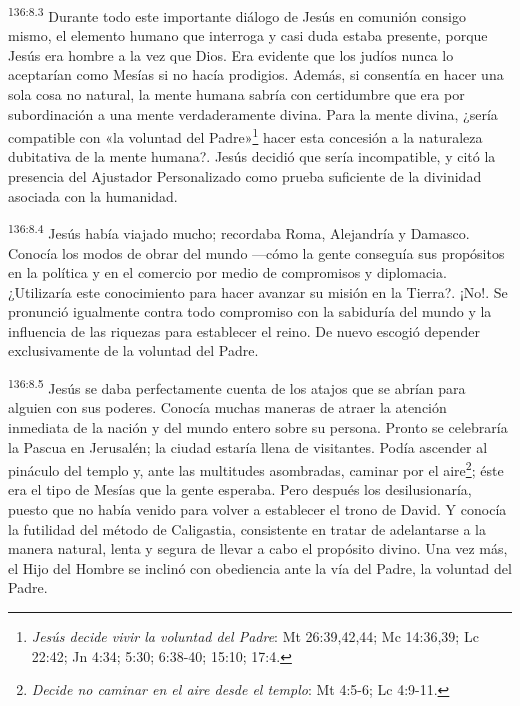\par
\textsuperscript{136:8.3} Durante todo este importante diálogo de Jesús en comunión consigo mismo, el elemento humano que interroga y casi duda estaba presente, porque Jesús era hombre a la vez que Dios. Era evidente que los judíos nunca lo aceptarían como Mesías si no hacía prodigios. Además, si consentía en hacer una sola cosa no natural, la mente humana sabría con certidumbre que era por subordinación a una mente verdaderamente divina. Para la mente divina, ¿sería compatible con «la voluntad del Padre»\footnote{\textit{Jesús decide vivir la voluntad del Padre}: Mt 26:39,42,44; Mc 14:36,39; Lc 22:42; Jn 4:34; 5:30; 6:38-40; 15:10; 17:4.} hacer esta concesión a la naturaleza dubitativa de la mente humana?. Jesús decidió que sería incompatible, y citó la presencia del Ajustador Personalizado como prueba suficiente de la divinidad asociada con la humanidad.

\par
\textsuperscript{136:8.4} Jesús había viajado mucho; recordaba Roma, Alejandría y Damasco. Conocía los modos de obrar del mundo ---cómo la gente conseguía sus propósitos en la política y en el comercio por medio de compromisos y diplomacia. ¿Utilizaría este conocimiento para hacer avanzar su misión en la Tierra?. ¡No!. Se pronunció igualmente contra todo compromiso con la sabiduría del mundo y la influencia de las riquezas para establecer el reino. De nuevo escogió depender exclusivamente de la voluntad del Padre.

\par
\textsuperscript{136:8.5} Jesús se daba perfectamente cuenta de los atajos que se abrían para alguien con sus poderes. Conocía muchas maneras de atraer la atención inmediata de la nación y del mundo entero sobre su persona. Pronto se celebraría la Pascua en Jerusalén; la ciudad estaría llena de visitantes. Podía ascender al pináculo del templo y, ante las multitudes asombradas, caminar por el aire\footnote{\textit{Decide no caminar en el aire desde el templo}: Mt 4:5-6; Lc 4:9-11.}; éste era el tipo de Mesías que la gente esperaba. Pero después los desilusionaría, puesto que no había venido para volver a establecer el trono de David. Y conocía la futilidad del método de Caligastia, consistente en tratar de adelantarse a la manera natural, lenta y segura de llevar a cabo el propósito divino. Una vez más, el Hijo del Hombre se inclinó con obediencia ante la vía del Padre, la voluntad del Padre.

